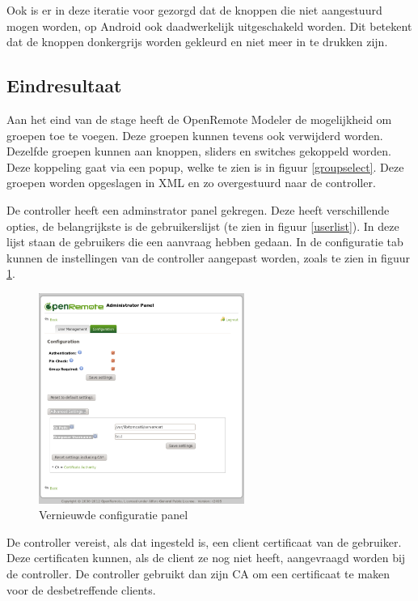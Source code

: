 \documentclass[]{article}
\begin{document}
Ook is er in deze iteratie voor gezorgd dat de knoppen die niet aangestuurd
mogen worden, op Android ook daadwerkelijk uitgeschakeld worden. Dit betekent dat
de knoppen donkergrijs worden gekleurd en niet meer in te drukken zijn.


\subsection{Eindresultaat}
Aan het eind van de stage heeft de OpenRemote Modeler de mogelijkheid om groepen
toe te voegen. Deze groepen kunnen tevens ook verwijderd worden. Dezelfde
groepen kunnen aan knoppen, sliders en switches gekoppeld worden. Deze koppeling
gaat via een popup, welke te zien is in figuur \ref{groupselect}. Deze groepen
worden opgeslagen in XML en zo overgestuurd naar de controller.

De controller heeft een adminstrator panel gekregen. Deze heeft verschillende
opties, de belangrijkste is de gebruikerslijst (te zien in figuur
\ref{userlist}). In deze lijst staan de gebruikers die een aanvraag hebben
gedaan. In de configuratie tab kunnen de instellingen van de controller
aangepast worden, zoals te zien in figuur \ref{configv2}. 

\begin{figure}[h!]
  \centering
    \includegraphics[width=0.6\textwidth,keepaspectratio]{configv2.pdf}
  \caption{Vernieuwde configuratie panel}
  \label{configv2}
\end{figure}

De controller vereist, als dat ingesteld is, een client certificaat van de
gebruiker. Deze certificaten kunnen, als de client ze nog niet heeft,
aangevraagd worden bij de controller. De controller gebruikt dan zijn CA om een
certificaat te maken voor de desbetreffende clients. 
\end{document}
